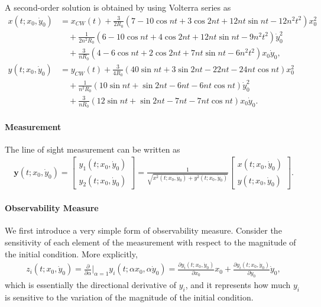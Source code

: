 \documentclass[10pt]{article}
\newcommand{\deriv}[2]{\ensuremath{\frac{\partial #1}{\partial #2}}}
\newcommand{\y}{\mathbf{y}}
\begin{document}
A second-order solution is obtained by using Volterra series as
\begin{align}
x(t;x_0,\dot y_0)&=x_{CW}(t)    +\frac{3}{2R_0}(7-10\cos nt +3\cos2nt +12nt \sin nt -12n^2t^2)x_0^2 \nonumber\\
&\quad +\frac{1}{2n^2 R_0}(6-10\cos nt +4\cos2nt +12nt \sin nt -9n^2t^2)\dot y_0^2 \nonumber\\
&\quad +\frac{3}{nR_0}(4-6\cos nt +2\cos2nt +7nt \sin nt -6n^2t^2)x_0\dot y_0,\\
y(t;x_0,\dot y_0)&=y_{CW}(t)    +\frac{3}{4R_0}(40\sin nt +3\sin 2nt -22nt-24nt\cos nt )x_0^2\nonumber\\
&\quad    +\frac{1}{n^2R_0}(10\sin nt +\sin 2nt -6nt-6nt\cos nt )\dot y_0^2\nonumber\\
&\quad    +\frac{3}{nR_0}(12\sin nt +\sin 2nt -7nt-7nt\cos nt )x_0\dot y_0.
\end{align}

\paragraph{Measurement}

The line of sight measurement can be written as
\begin{align}
\y(t;x_0,\dot y_0) =\begin{bmatrix} y_1(t;x_0,\dot y_0) \\ y_2(t;x_0,\dot y_0) \end{bmatrix} = \frac{1}{\sqrt{x^2(t;x_0,\dot y_0) + y^2(t;x_0,\dot y_0)}}\begin{bmatrix} x(t;x_0,\dot y_0)\\y(t;x_0,\dot y_0)\end{bmatrix}.
\end{align}

\paragraph{Observability Measure}

We first introduce a very simple form of observability measure. Consider the sensitivity of each element of the measurement with respect to the magnitude of the initial condition. More explicitly,
\begin{align*}
z_i (t; x_0,\dot y_0) = \deriv{}{\alpha}\bigg|_{\alpha=1} y_i(t; \alpha x_0,\alpha \dot y_0) =\deriv{y_i(t;x_0,\dot y_0)}{x_0}x_0 + \deriv{y_i(t;x_0,\dot y_0)}{\dot y_0}\dot y_0,
\end{align*}
which is essentially the directional derivative of $y_i$, and it represents how much $y_i$ is sensitive to the variation of the magnitude of the initial condition.
\end{document}
